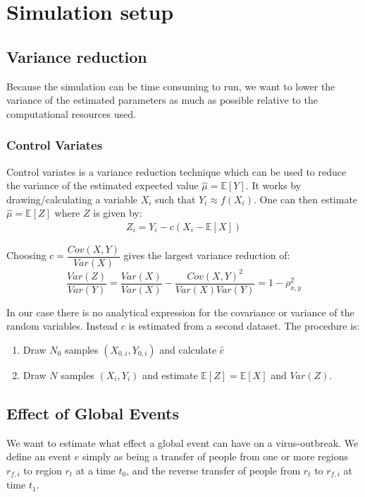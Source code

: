 \section{Simulation setup}
\subsection{Variance reduction}
Because the simulation can be time consuming to run, we want to lower the variance of the estimated parameters as much as possible relative to the computational resources used.

\subsubsection{Control Variates}
Control variates is a variance reduction technique which can be used to reduce the variance of the estimated expected value $\hat{\mu} = \mathbb{E}[Y]$. It works by drawing/calculating a variable $X_i$ such that $Y_i \approx f(X_i)$. One can then estimate $\hat{\mu} = \mathbb{E}[Z]$ where $Z$ is given by:
\begin{align}
Z_i = Y_i - c (X_i - \mathbb{E}[X])
\end{align}

Choosing $c = \dfrac{Cov(X, Y)}{Var(X)}$ gives the largest variance reduction of:
\begin{equation}
\frac{Var(Z)}{Var(Y)} = \frac{Var(X)}{Var(X)} - \frac{Cov(X, Y)^2}{Var(X) Var(Y)} = 1 - \rho_{x, y}^2
\end{equation}

In our case there is no analytical expression for the covariance or variance of the random variables. Instead $c$ is estimated from a second dataset. The procedure is:
\begin{enumerate}
	\item Draw $N_0$ samples $(X_{0,i}, Y_{0, i})$ and calculate $\hat{c}$
	\item Draw $N$ samples $(X_i, Y_i)$ and estimate $\mathbb{E}[Z] = \mathbb{E}[X]$ and $Var(Z)$.
\end{enumerate}

\subsection{Effect of Global Events}
We want to estimate what effect a global event can have on a virus-outbreak. We define an event $e$ simply as being a transfer of people from one or more regions $r_{f, i}$ to region $r_t$ at a time $t_0$, and the reverse transfer of people from $r_t$ to $r_{f, i}$ at time $t_1$.

